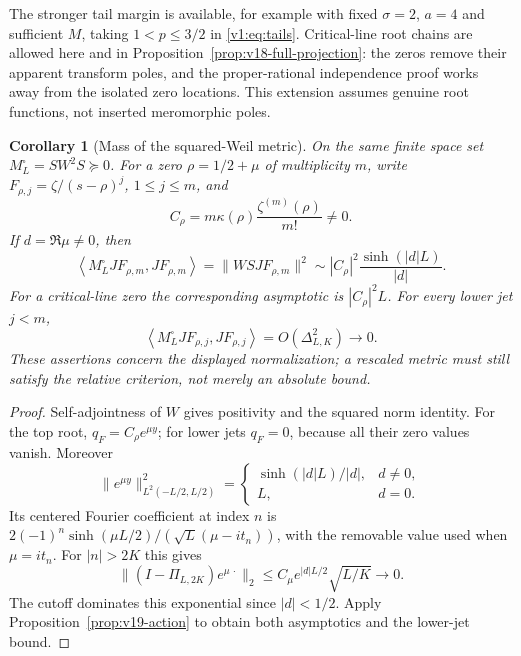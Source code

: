 \documentclass[11pt]{article}
\newtheorem{corollary}[theorem]{Corollary}
\theoremstyle{remark}
\newcommand{\ip}[2]{\left\langle #1,#2\right\rangle}
\begin{document}
The stronger tail margin is available, for example with fixed
$\sigma=2$, $a=4$ and sufficient $M$, taking $1<p\le3/2$ in
\eqref{v1:eq:tails}. Critical-line root chains are allowed here and
in Proposition~\ref{prop:v18-full-projection}: the zeros remove their
apparent transform poles, and the proper-rational independence proof
works away from the isolated zero locations. This extension assumes
genuine root functions, not inserted meromorphic poles.

\begin{corollary}[Mass of the squared-Weil metric]
\label{cor:v19-square}
On the same finite space set $M_L^{\square}=S W^2 S\succeq0$.
For a zero $\rho=1/2+\mu$ of multiplicity $m$, write
$F_{\rho,j}=\zeta/(s-\rho)^j$, $1\le j\le m$, and
\[
 C_\rho=m\kappa(\rho)\frac{\zeta^{(m)}(\rho)}{m!}\ne0.
\]
If $d=\Re\mu\ne0$, then
\begin{equation}\label{eq:v19-square-top}
 \ip{M_L^{\square}JF_{\rho,m}}{JF_{\rho,m}}
 =\|WSJF_{\rho,m}\|^2
 \sim |C_\rho|^2\frac{\sinh(|d|L)}{|d|}.
\end{equation}
For a critical-line zero the corresponding asymptotic is
$|C_\rho|^2L$. For every lower jet $j<m$,
\begin{equation}\label{eq:v19-square-lower}
 \ip{M_L^{\square}JF_{\rho,j}}{JF_{\rho,j}}
       =O(\Delta_{L,K}^2)\longrightarrow0.
\end{equation}
These assertions concern the displayed normalization; a rescaled metric
must still satisfy the relative criterion, not merely an absolute bound.
\end{corollary}
\begin{proof}
Self-adjointness of $W$ gives positivity and the squared norm identity.
For the top root, $q_F=C_\rho e^{\mu y}$; for lower jets $q_F=0$,
because all their zero values vanish. Moreover
\[
 \|e^{\mu y}\|_{L^2(-L/2,L/2)}^2
 =\begin{cases}\sinh(|d|L)/|d|,&d\ne0,\\L,&d=0.\end{cases}
\]
Its centered Fourier coefficient at index $n$ is
$2(-1)^n\sinh(\mu L/2)/(\sqrt L(\mu-it_n))$, with the removable
value used when $\mu=it_n$. For $|n|>2K$ this gives
\[
 \|(I-\Pi_{L,2K})e^{\mu\,\cdot}\|_2
       \le C_\mu e^{|d|L/2}\sqrt{L/K}\longrightarrow0.
\]
The cutoff dominates this exponential since $|d|<1/2$.
Apply Proposition~\ref{prop:v19-action} to obtain both asymptotics
and the lower-jet bound.
\end{proof}
\end{document}
